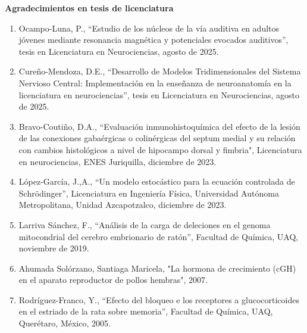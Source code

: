\textbf{Agradecimientos en tesis de licenciatura}

\begin{enumerate}
\item  Ocampo-Luna, P., “Estudio de los núcleos de la vía auditiva en adultos jóvenes mediante resonancia magnética y 
potenciales 
evocados auditivos”, tesis en Licenciatura en Neurociencias, agosto de 2025.

\item  Cureño-Mendoza, D.E., “Desarrollo de Modelos Tridimensionales del Sistema Nervioso Central: Implementación en la 
enseñanza 
de neuroanatomía en la licenciatura en neurociencias”, tesis en Licenciatura en Neurociencias, agosto de 2025.

\item  Bravo-Coutiño, D.A., “Evaluación inmunohistoquímica del efecto de la lesión de las conexiones gabaérgicas o 
colinérgicas 
del septum medial y su relación con cambios histológicos a nivel de hipocampo dorsal y fimbria", Licenciatura en 
neurociencias, ENES Juriquilla, diciembre de 2023.

\item  López-García, J.,A., “Un modelo estocástico para la ecuación controlada de Schrödinger”, Licenciatura en Ingeniería 
Física, Universidad Autónoma Metropolitana, Unidad Azcapotzalco, diciembre de 2023.

\item  Larriva Sánchez, F., “Análisis de la carga de deleciones en el genoma mitocondrial del cerebro embrionario de ratón”, 
Facultad de Química, UAQ, noviembre de 2019.

\item  Ahumada Solórzano, Santiaga Maricela, "La hormona de crecimiento (cGH) en el aparato reproductor de pollos hembras", 
2007.

\item  Rodríguez-Franco, Y., “Efecto del bloqueo e los receptores a glucocorticoides en el estriado de la rata sobre 
memoria”, 
Facultad de Química, UAQ, Querétaro, México, 2005.

\end{enumerate}

